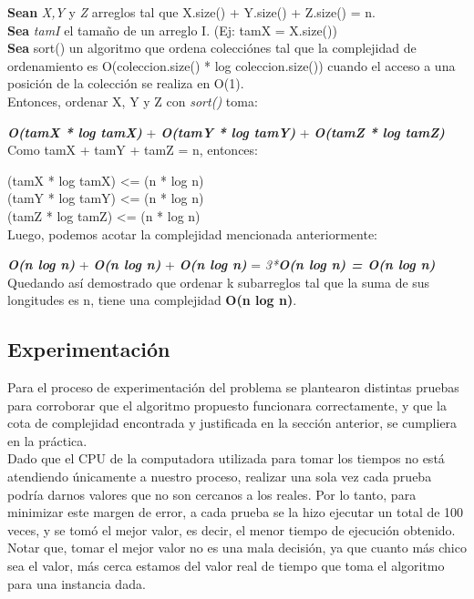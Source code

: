 \documentclass[10pt,a4paper]{article}
\begin{document}
\noindent \textbf{Sean} \textit{X,Y} y \textit{Z} arreglos tal que X.size() + Y.size() + Z.size() = n.\\
\textbf{Sea} \textit{tamI} el tamaño de un arreglo I. (Ej: tamX = X.size())\\
\textbf{Sea} sort() un algoritmo que ordena colecciónes tal que la complejidad de ordenamiento es O(coleccion.size() * log coleccion.size()) cuando el acceso a una posición de la colección se realiza en O(1).\\

\noindent Entonces, ordenar X, Y y Z con \textit{sort()} toma:

\indent \textit{\textbf{O(tamX * log tamX)}} + \textit{\textbf{O(tamY * log tamY)}} + \textit{\textbf{O(tamZ * log tamZ)}}\\

\noindent Como tamX + tamY + tamZ = n, entonces:

\indent (tamX * log tamX) \textless = (n * log n)\\
\indent (tamY * log tamY) \textless = (n * log n)\\
\indent (tamZ * log tamZ) \textless = (n * log n)\\

\noindent Luego, podemos acotar la complejidad mencionada anteriormente:

\indent \textit{\textbf{O(n log n)}} + \textit{\textbf{O(n log n)}} + \textit{\textbf{O(n log n)}} = \textit{3*\textbf{O(n log n) = O(n log n)}}\\

\noindent Quedando así demostrado que ordenar k subarreglos tal que la suma de sus longitudes es n, tiene una complejidad \textbf{O(n log n)}.

\newpage
\subsection{Experimentación}

\noindent Para el proceso de experimentación del problema se plantearon distintas pruebas para corroborar que el algoritmo propuesto funcionara correctamente, y que la cota de complejidad encontrada y justificada en la sección anterior, se cumpliera en la práctica.\\

\noindent Dado que el CPU de la computadora utilizada para tomar los tiempos no está atendiendo únicamente a nuestro proceso, realizar una sola vez cada prueba podría darnos valores que no son cercanos a los reales. Por lo tanto, para minimizar este margen de error, a cada prueba se la hizo ejecutar un total de 100 veces, y se tomó el mejor valor, es decir, el menor tiempo de ejecución obtenido. Notar que, tomar el mejor valor no es una mala decisión, ya que cuanto más chico sea el valor, más cerca estamos del valor real de tiempo que toma el algoritmo para una instancia dada.\\
\end{document}
